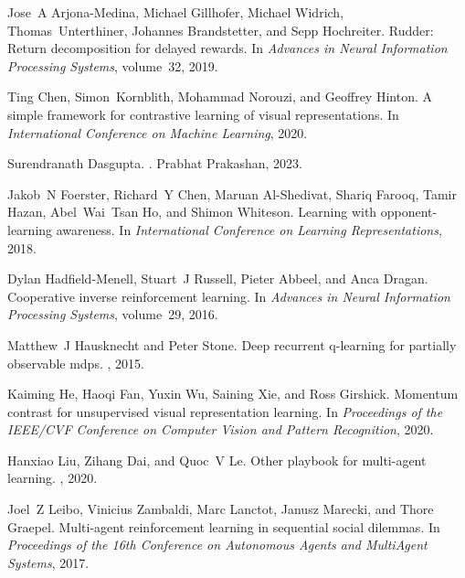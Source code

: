\documentclass[11pt]{article}
\begin{document}
\begin{thebibliography}{}
Jose~A Arjona-Medina, Michael Gillhofer, Michael Widrich, Thomas~Unterthiner,
  Johannes Brandstetter, and Sepp Hochreiter.
\newblock Rudder: Return decomposition for delayed rewards.
\newblock In {\em Advances in Neural Information Processing Systems},
  volume~32, 2019.

Ting Chen, Simon~Kornblith, Mohammad Norouzi, and Geoffrey Hinton.
\newblock A simple framework for contrastive learning of visual
  representations.
\newblock In {\em International Conference on Machine Learning}, 2020.

Surendranath Dasgupta.
.
\newblock Prabhat Prakashan, 2023.

Jakob~N Foerster, Richard~Y Chen, Maruan Al-Shedivat, Shariq Farooq,
  Tamir Hazan, Abel~Wai~Tsan Ho, and Shimon Whiteson.
\newblock Learning with opponent-learning awareness.
\newblock In {\em International Conference on Learning Representations},
  2018.

Dylan Hadfield-Menell, Stuart~J Russell, Pieter Abbeel, and Anca Dragan.
\newblock Cooperative inverse reinforcement learning.
\newblock In {\em Advances in Neural Information Processing Systems},
  volume~29, 2016.

Matthew~J Hausknecht and Peter Stone.
\newblock Deep recurrent q-learning for partially observable mdps.
, 2015.

Kaiming He, Haoqi Fan, Yuxin Wu, Saining Xie, and Ross Girshick.
\newblock Momentum contrast for unsupervised visual representation learning.
\newblock In {\em Proceedings of the IEEE/CVF Conference on Computer Vision
  and Pattern Recognition}, 2020.

Hanxiao Liu, Zihang Dai, and Quoc~V Le.
\newblock Other playbook for multi-agent learning.
, 2020.

Joel~Z Leibo, Vinicius Zambaldi, Marc Lanctot, Janusz Marecki, and Thore
  Graepel.
\newblock Multi-agent reinforcement learning in sequential social dilemmas.
\newblock In {\em Proceedings of the 16th Conference on Autonomous Agents and
  MultiAgent Systems}, 2017.


\end{thebibliography}
\end{document}
